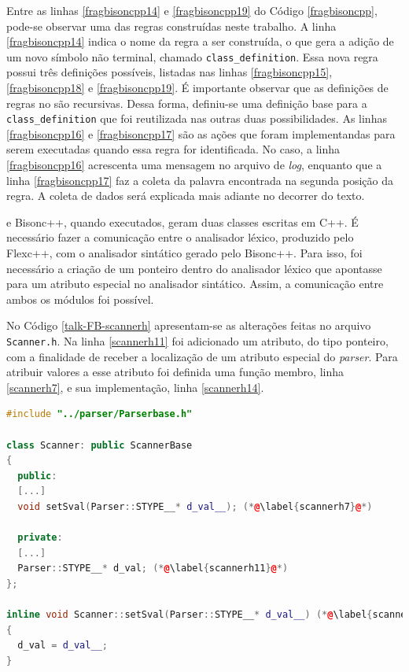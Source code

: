 Entre as linhas \ref{fragbisoncpp14} e \ref{fragbisoncpp19} do Código
\ref{fragbisoncpp}, pode-se observar uma das regras construídas neste trabalho.
A linha \ref{fragbisoncpp14} indica o nome da regra a ser construída, o que
gera a adição de um novo símbolo não terminal, chamado
\lstinline|class_definition|. Essa nova regra possui três definições possíveis,
listadas nas linhas \ref{fragbisoncpp15}, \ref{fragbisoncpp18} e
\ref{fragbisoncpp19}. É importante observar que as definições de regras no
\bisoncpp são recursivas. Dessa forma, definiu-se uma definição base para a
\lstinline|class_definition| que foi reutilizada nas outras duas possibilidades.
As linhas \ref{fragbisoncpp16} e \ref{fragbisoncpp17} são as ações que foram
implementandas para serem executadas quando essa regra for identificada.
No caso, a linha \ref{fragbisoncpp16} acrescenta uma mensagem no arquivo de
\textit{log}, enquanto que a linha \ref{fragbisoncpp17} faz a coleta da
palavra encontrada na segunda posição da regra. A coleta de dados será explicada mais
adiante no decorrer do texto.

\flexcpp e \textsf{Bisonc++}, quando executados, geram duas classes escritas
em C++.
É necessário fazer a comunicação entre o analisador léxico, produzido pelo
\textsf{Flexc++}, com o analisador sintático gerado pelo \textsf{Bisonc++}.
Para isso, foi necessário a criação de um ponteiro dentro do analisador
léxico que apontasse para um atributo especial no analisador sintático.
Assim, a comunicação entre ambos os módulos foi possível.

No Código \ref{talk-FB-scannerh} apresentam-se as alterações feitas no
arquivo \lstinline|Scanner.h|. Na linha \ref{scannerh11} foi adicionado um atributo,
do tipo ponteiro, com a finalidade de receber a localização de um atributo especial
do \textit{parser}. Para atribuir valores a esse atributo foi definida uma
função membro, linha \ref{scannerh7}, e sua implementação, linha \ref{scannerh14}.
\begin{lstlisting}[language=C++, label=talk-FB-scannerh, caption=Alterações no Scanner.h para comunicação entre Analisador Léxico e Sintático]
#include "../parser/Parserbase.h"

class Scanner: public ScannerBase
{
  public:
  [...]
  void setSval(Parser::STYPE__* d_val__); (*@\label{scannerh7}@*)

  private:
  [...]
  Parser::STYPE__* d_val; (*@\label{scannerh11}@*)
};

inline void Scanner::setSval(Parser::STYPE__* d_val__) (*@\label{scannerh14}@*)
{
  d_val = d_val__;
}
\end{lstlisting}

